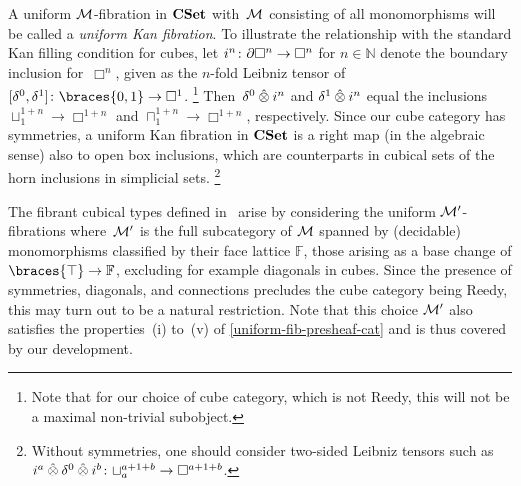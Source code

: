 \documentclass[reqno,10pt,a4paper,oneside,draft]{amsart}
\begin{document}
\begin{example}
A uniform $\cal{M}$-fibration in $\CSet$ with~$\cal{M}$ consisting of all  monomorphisms will be called a \emph{uniform Kan fibration}.
To illustrate the relationship with the standard Kan filling condition for cubes, let $i^n \co \partial \Box^n \to \Box^n$ for $n \in \mathbb{N}$ denote the boundary inclusion for~$\Box^n$, given as the $n$-fold Leibniz tensor of $[\lcyl, \rcyl] \co \braces{0, 1} \to \Box^1$.%
\footnote{Note that for our choice of cube category, which is not Reedy, this will not be a maximal non-trivial subobject.}
Then~$\lcyl \hatotimes i^n$ and $\rcyl \hatotimes i^n$ equal the inclusions $\sqcup_1^{1+n} \to \Box^{1+n}$ and $\sqcap_1^{1+n} \to \Box^{1+n}$, respectively.
Since our cube category has symmetries, a uniform Kan fibration in $\CSet$ is a right map (in the algebraic sense) also to open box inclusions, which are
counterparts in cubical sets of the horn inclusions in simplicial sets.%
\footnote{Without symmetries, one should consider two-sided Leibniz tensors such as $i^a \hatotimes \lcyl \hatotimes i^b \co \sqcup_a^{a+1+b} \to \Box^{a+1+b}$.}

The fibrant cubical types defined in~\cite{cohen-et-al:cubicaltt} arise by considering the uniform $\cal{M}'$-fibrations where~$\cal{M}'$ is the full subcategory of $\cal{M}$ spanned by (decidable) monomorphisms classified by their face lattice $\mathbb{F}$, \ie those arising as a base change of $\braces{\top} \to \mathbb{F}$, excluding for example diagonals in cubes.
Since the presence of symmetries, diagonals, and connections precludes the cube category being Reedy, this may turn out to be a natural restriction.
Note that this choice $\cal{M}'$ also satisfies the properties~(i) to~(v) of \cref{uniform-fib-presheaf-cat} and is thus covered by our development.
\end{example}
\end{document}
